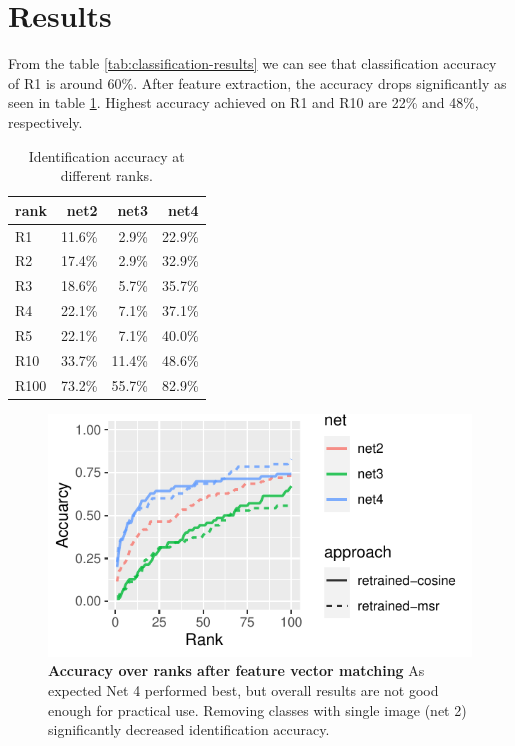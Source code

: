 \documentclass[fleqn,moreauthors,10pt]{ds_report}
\begin{document}

\section*{Results}

From the table \ref{tab:classification-results} we can see that classification accuracy of R1 is around 60\%. After feature extraction, the accuracy drops significantly as seen in table \ref{tab:identification-results}. Highest accuracy achieved on R1 and R10 are 22\% and 48\%, respectively.

\begin{table}[hbt]
	\caption{Identification accuracy at different ranks.}
	\centering
	\begin{tabular}{l r r r}
		\toprule
		rank & net2    & net3    & net4   \\
		\midrule
		R1   & 11.6\%  &  2.9\%  & 22.9\% \\
		R2   & 17.4\%  &  2.9\%  & 32.9\% \\
		R3   & 18.6\%  &  5.7\%  & 35.7\% \\
		R4   & 22.1\%  &  7.1\%  & 37.1\% \\
		R5   & 22.1\%  &  7.1\%  & 40.0\% \\
		R10  & 33.7\%  & 11.4\%  & 48.6\% \\
		R100 & 73.2\%  & 55.7\%  & 82.9\% \\
		\bottomrule
	\end{tabular}
	\label{tab:identification-results}
\end{table}

\begin{figure}[htb]\centering
	\includegraphics[width=\linewidth]{ranks-ident-nets.pdf}
	\caption{\textbf{Accuracy over ranks after feature vector matching} As expected Net 4 performed best, but overall results are not good enough for practical use. Removing classes with single image (net 2) significantly decreased identification accuracy.}
	\label{fig:ranks-ident-nets}
\end{figure}
\end{document}
